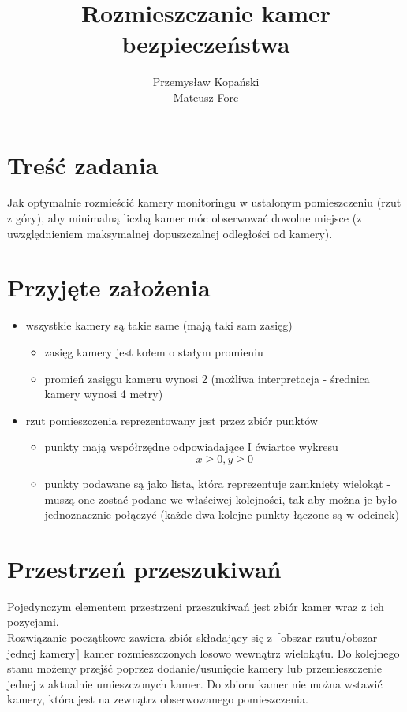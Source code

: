 \documentclass[12pt,a4paper]{article}
\title{Rozmieszczanie kamer bezpieczeństwa}
\author{Przemysław Kopański \\ Mateusz Forc}
\begin{document}
\maketitle
\tableofcontents
\section{Treść zadania}
Jak optymalnie rozmieścić kamery monitoringu w ustalonym pomieszczeniu (rzut z góry),
aby minimalną liczbą kamer móc obserwować dowolne miejsce 
(z uwzględnieniem maksymalnej dopuszczalnej odległości od kamery).
%
\newpage
\section{Przyjęte założenia}
\begin{itemize}
\item wszystkie kamery są takie same (mają taki sam zasięg)
	\begin{itemize}
	\item zasięg kamery jest kołem o stałym promieniu
	\item promień zasięgu kameru wynosi 2 (możliwa interpretacja - średnica kamery wynosi 4 metry)
	\end{itemize}
\item rzut pomieszczenia reprezentowany jest przez zbiór punktów
	\begin{itemize}
	\item punkty mają współrzędne odpowiadające I ćwiartce wykresu \[x \geq 0, y \geq 0\]
	\item punkty podawane są jako lista, która reprezentuje zamknięty wielokąt - muszą one zostać
	      podane we właściwej kolejności, tak aby można je było jednoznacznie połączyć 
	      (każde dwa kolejne punkty łączone są w odcinek)
	\end{itemize}
\end{itemize}
%
\section{Przestrzeń przeszukiwań}
Pojedynczym elementem przestrzeni przeszukiwań jest zbiór kamer wraz z ich pozycjami. \\
Rozwiązanie początkowe zawiera zbiór składający się z $\lceil$obszar rzutu/obszar jednej kamery$\rceil$ kamer
rozmieszczonych losowo wewnątrz wielokątu.
Do kolejnego stanu możemy przejść poprzez dodanie/usunięcie kamery lub przemieszczenie
jednej z aktualnie umieszczonych kamer.
Do zbioru kamer nie można wstawić kamery, która jest na zewnątrz obserwowanego pomieszczenia.
%
\newpage
\end{document}
